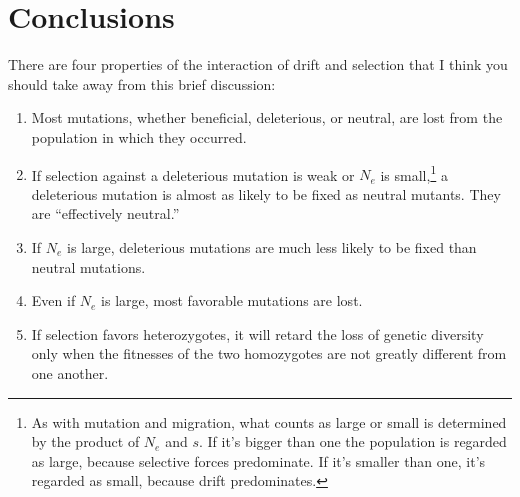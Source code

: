 \section*{Conclusions}

There are four properties of the interaction of drift and selection
that I think you should take away from this brief
discussion:

\begin{enumerate}

\item Most mutations, whether beneficial, deleterious, or neutral, are
  lost from the population in which they occurred.

\item If selection against a deleterious mutation is weak or $N_e$ is
  small,\footnote{As with mutation and migration, what counts as large
    or small is determined by the product of $N_e$ and $s$. If it's
    bigger than one the population is regarded as large, because
    selective forces predominate. If it's smaller than one, it's
    regarded as small, because drift predominates.} a deleterious
  mutation is almost as likely to be fixed as neutral mutants. They
  are ``effectively neutral.''

\item If $N_e$ is large, deleterious mutations are much less likely to
  be fixed than neutral mutations.

\item Even if $N_e$ is large, most favorable mutations are lost.

\item If selection favors heterozygotes, it will retard the loss of
  genetic diversity only when the fitnesses of the two homozygotes are
  not greatly different from one another.

\end{enumerate}

